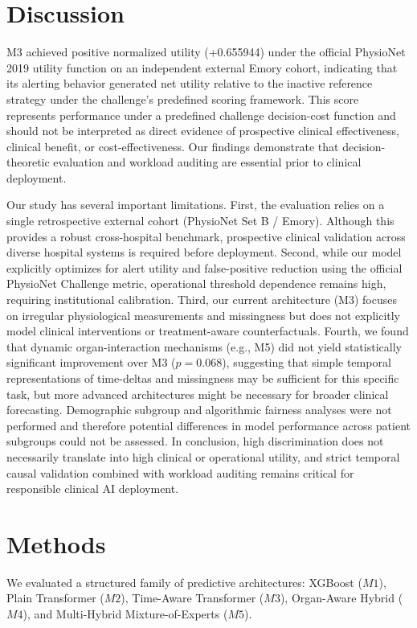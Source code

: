\documentclass[11pt,a4paper]{article}
\begin{document}
\section*{Discussion}
M3 achieved positive normalized utility (+0.655944) under the official PhysioNet 2019 utility function on an independent external Emory cohort, indicating that its alerting behavior generated net utility relative to the inactive reference strategy under the challenge's predefined scoring framework. This score represents performance under a predefined challenge decision-cost function and should not be interpreted as direct evidence of prospective clinical effectiveness, clinical benefit, or cost-effectiveness. Our findings demonstrate that decision-theoretic evaluation and workload auditing are essential prior to clinical deployment.

Our study has several important limitations. First, the evaluation relies on a single retrospective external cohort (PhysioNet Set B / Emory). Although this provides a robust cross-hospital benchmark, prospective clinical validation across diverse hospital systems is required before deployment. Second, while our model explicitly optimizes for alert utility and false-positive reduction using the official PhysioNet Challenge metric, operational threshold dependence remains high, requiring institutional calibration. Third, our current architecture (M3) focuses on irregular physiological measurements and missingness \cite{ref:che2018} but does not explicitly model clinical interventions or treatment-aware counterfactuals. Fourth, we found that dynamic organ-interaction mechanisms (e.g., M5) did not yield statistically significant improvement over M3 ($p=0.068$), suggesting that simple temporal representations of time-deltas and missingness may be sufficient for this specific task, but more advanced architectures might be necessary for broader clinical forecasting. Demographic subgroup and algorithmic fairness analyses were not performed and therefore potential differences in model performance across patient subgroups could not be assessed. In conclusion, high discrimination does not necessarily translate into high clinical or operational utility, and strict temporal causal validation combined with workload auditing remains critical for responsible clinical AI deployment.

\section*{Methods}
We evaluated a structured family of predictive architectures: XGBoost ($M1$), Plain Transformer ($M2$), Time-Aware Transformer ($M3$), Organ-Aware Hybrid ($M4$), and Multi-Hybrid Mixture-of-Experts ($M5$).
\end{document}

